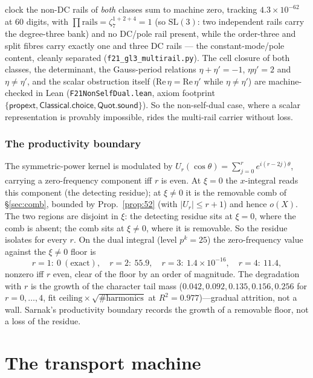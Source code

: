 \documentclass[11pt]{article}
\theoremstyle{definition}
\begin{document}
clock the non-DC rails of \emph{both} classes sum to machine zero, tracking $4.3\times10^{-62}$ at $60$ digits,
with $\prod\text{rails}=\zeta_7^{1+2+4}=1$ (so $\mathrm{SL}(3)$: two independent rails carry the degree-three
bank) and no DC/pole rail present, while the order-three and split fibres carry exactly one and three DC rails ---
the constant-mode/pole content, cleanly separated (\texttt{f21\_gl3\_multirail.py}). The cell closure of both
classes, the determinant, the Gauss-period relations $\eta+\eta'=-1$, $\eta\eta'=2$ and $\eta\ne\eta'$, and the
scalar obstruction itself ($\mathrm{Re}\,\eta=\mathrm{Re}\,\eta'$ while $\eta\ne\eta'$) are machine-checked in Lean
(\texttt{F21NonSelfDual.lean}, axiom footprint $\{\mathsf{propext},\allowbreak\mathsf{Classical.choice},\allowbreak
\mathsf{Quot.sound}\}$). So the non-self-dual case, where a scalar representation is provably impossible, rides the
multi-rail carrier without loss.

\section{The productivity boundary}\label{sec:sarnak}

The symmetric-power kernel is modulated by $U_r(\cos\theta)=\sum_{j=0}^r e^{i(r-2j)\theta}$, carrying
a zero-frequency component iff $r$ is even. At $\xi=0$ the $x$-integral reads this component (the
detecting residue); at $\xi\neq0$ it is the removable comb of \S\ref{sec:comb}, bounded by
Prop.~\ref{prop:52} (with $|U_r|\le r+1$) and hence $o(X)$. The two regions are disjoint in $\xi$:
the detecting residue sits at $\xi=0$, where the comb is absent; the comb sits at $\xi\neq0$, where it
is removable. So the residue isolates for every $r$. On the dual integral (level $p^k=25$) the
zero-frequency value against the $\xi\neq0$ floor is
\[
  r=1:\ 0\ (\text{exact}),\quad r=2:\ 55.9,\quad r=3:\ 1.4\times10^{-16},\quad r=4:\ 11.4,
\]
nonzero iff $r$ even, clear of the floor by an order of magnitude. The degradation with $r$ is the
growth of the character tail mass ($0.042,0.092,0.135,0.156,0.256$ for $r=0,\dots,4$, fit
$\text{ceiling}\times\sqrt{\#\text{harmonics}}$ at $R^2=0.977$)---gradual attrition, not a wall.
Sarnak's productivity boundary \cite[fn.~5]{AltIII} records the growth of a removable floor, not a
loss of the residue.

\part{The transport machine}
\end{document}

